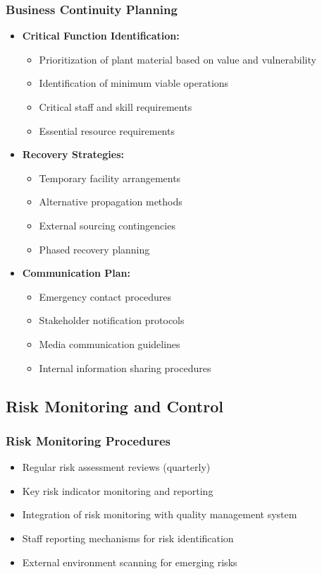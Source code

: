\subsubsection{Business Continuity Planning}
\begin{itemize}
    \item \textbf{Critical Function Identification:}
    \begin{itemize}
        \item Prioritization of plant material based on value and vulnerability
        \item Identification of minimum viable operations
        \item Critical staff and skill requirements
        \item Essential resource requirements
    \end{itemize}
    
    \item \textbf{Recovery Strategies:}
    \begin{itemize}
        \item Temporary facility arrangements
        \item Alternative propagation methods
        \item External sourcing contingencies
        \item Phased recovery planning
    \end{itemize}
    
    \item \textbf{Communication Plan:}
    \begin{itemize}
        \item Emergency contact procedures
        \item Stakeholder notification protocols
        \item Media communication guidelines
        \item Internal information sharing procedures
    \end{itemize}
\end{itemize}

\subsection{Risk Monitoring and Control}

\subsubsection{Risk Monitoring Procedures}
\begin{itemize}
    \item Regular risk assessment reviews (quarterly)
    \item Key risk indicator monitoring and reporting
    \item Integration of risk monitoring with quality management system
    \item Staff reporting mechanisms for risk identification
    \item External environment scanning for emerging risks
\end{itemize}


